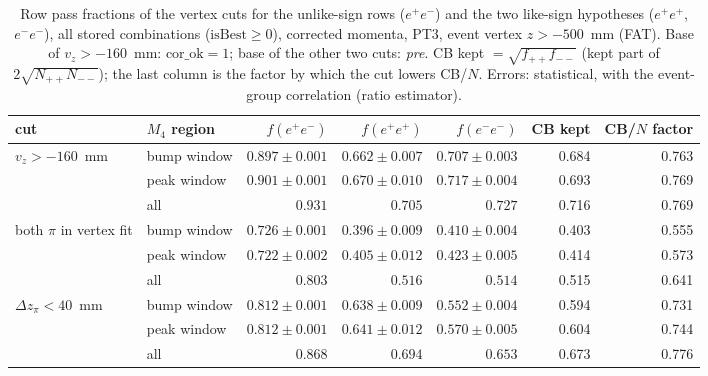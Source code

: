 \begin{table}[H]
\centering
\scriptsize
\caption{Row pass fractions of the vertex cuts for the unlike-sign rows ($e^+e^-$) and the two like-sign hypotheses ($e^+e^+$, $e^-e^-$), all stored combinations ($\mathrm{isBest}\ge0$), corrected momenta, PT3, event vertex $z>-500$~mm (FAT). Base of $v_z>-160$~mm: $\mathrm{cor\_ok}=1$; base of the other two cuts: \emph{pre}. CB kept $=\sqrt{f_{++}f_{--}}$ (kept part of $2\sqrt{N_{++}N_{--}}$); the last column is the factor by which the cut lowers CB/$N$. Errors: statistical, with the event-group correlation (ratio estimator).}
\label{tab:spec_vertexcut}
\begin{tabular}{llrrrrr}
\toprule
cut & $M_4$ region & $f(e^+e^-)$ & $f(e^+e^+)$ & $f(e^-e^-)$ & CB kept & CB/$N$ factor \\
\midrule
$v_z>-160$~mm & bump window & $0.897\pm0.001$ & $0.662\pm0.007$ & $0.707\pm0.003$ & 0.684 & 0.763 \\
 & peak window & $0.901\pm0.001$ & $0.670\pm0.010$ & $0.717\pm0.004$ & 0.693 & 0.769 \\
 & all & $0.931$ & $0.705$ & $0.727$ & 0.716 & 0.769 \\
\midrule
both $\pi$ in vertex fit & bump window & $0.726\pm0.001$ & $0.396\pm0.009$ & $0.410\pm0.004$ & 0.403 & 0.555 \\
 & peak window & $0.722\pm0.002$ & $0.405\pm0.012$ & $0.423\pm0.005$ & 0.414 & 0.573 \\
 & all & $0.803$ & $0.516$ & $0.514$ & 0.515 & 0.641 \\
\midrule
$\Delta z_\pi<40$~mm & bump window & $0.812\pm0.001$ & $0.638\pm0.009$ & $0.552\pm0.004$ & 0.594 & 0.731 \\
 & peak window & $0.812\pm0.001$ & $0.641\pm0.012$ & $0.570\pm0.005$ & 0.604 & 0.744 \\
 & all & $0.868$ & $0.694$ & $0.653$ & 0.673 & 0.776 \\
\bottomrule
\end{tabular}
\end{table}
